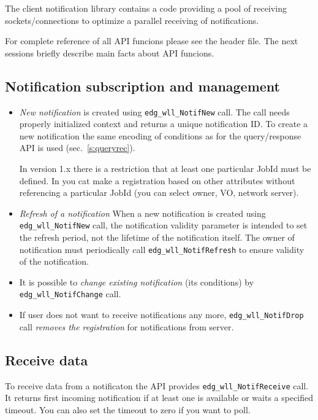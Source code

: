 The client notification library contains a code providing a pool of
receiving sockets/connections to optimize a parallel receiving of
notifications.

For complete reference of all API funcions please see the header
file. The next sessions briefly describe main facts about API
funcions.

\subsection{Notification subscription and management}
\begin{itemize}
 \item \emph{New notification} is created using
  \verb'edg_wll_NotifNew' call. The call needs properly initialized
  context and returns a unique notification ID. To create a new
  notification the same encoding of conditions as for the \LB
  query/response API is used (sec.~\ref{s:queryrec}). 

  In version 1.x
  there is a restriction that at least one particular JobId must be
  defined. In  you cat make a registration based on other
  attributes without referencing a particular JobId (you can select
  owner, VO, network server).

 \item \emph {Refresh of a notification} When a new notification is
  created using \verb'edg_wll_NotifNew' call, the notification
  validity parameter is intended to set the refresh period, not the
  lifetime of the notification itself. The owner of notification must
  periodically call \verb'edg_wll_NotifRefresh' to ensure validity of
  the notification.

 \item It is possible to \emph{change existing notification} (its conditions) by
  \verb'edg_wll_NotifChange' call.

 \item If user does not want to receive notifications any more,
  \verb'edg_wll_NotifDrop' call \emph{removes the registration} for
  notifications from \LB server.
\end{itemize}

\subsection{Receive data}
To receive data from a notificaton the API provides
\verb'edg_wll_NotifReceive' call. It returns first incoming
notification if at least one is available or waits a specified timeout. You can
also set the timeout to zero if you want to poll.

